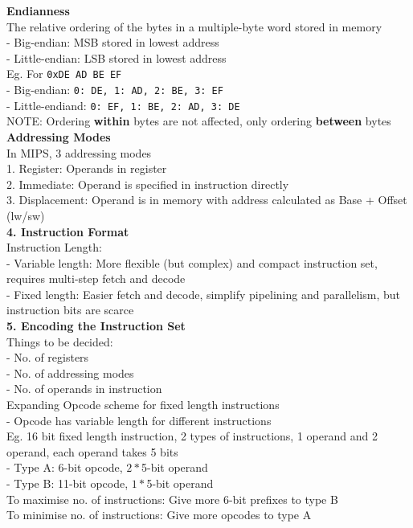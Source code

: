 \documentclass[10pt, a4paper]{article}
\begin{document}
\begin{multicols*}{3}
		\textbf{Endianness}\\
		The relative ordering of the bytes in a multiple-byte word stored in memory\\
		- Big-endian: MSB stored in lowest address\\
		- Little-endian: LSB stored in lowest address\\
		Eg. For \texttt{0xDE AD BE EF}\\
		- Big-endian: \texttt{0: DE, 1: AD, 2: BE, 3: EF}\\
		- Little-endiand: \texttt{0: EF, 1: BE, 2: AD, 3: DE}\\
		NOTE: Ordering \textbf{within} bytes are not affected, only ordering \textbf{between} bytes\\
		
		\textbf{Addressing Modes}\\
		In MIPS, 3 addressing modes\\
		1. Register: Operands in register\\
		2. Immediate: Operand is specified in instruction directly\\
		3. Displacement: Operand is in memory with address calculated as Base + Offset (lw/sw)\\
		
		\textbf{4. Instruction Format}\\
		Instruction Length:\\
		- Variable length: More flexible (but complex) and compact instruction set, requires multi-step fetch and decode\\
		- Fixed length: Easier fetch and decode, simplify pipelining and parallelism, but instruction bits are scarce\\
		
		\textbf{5. Encoding the Instruction Set}\\
		Things to be decided:\\
		- No. of registers\\
		- No. of addressing modes\\
		- No. of operands in instruction\\
		Expanding Opcode scheme for fixed length instructions\\
		- Opcode has variable length for different instructions\\
		Eg. 16 bit fixed length instruction, 2 types of instructions, 1 operand and 2 operand, each operand takes 5 bits\\
		- Type A: 6-bit opcode, $2 *$5-bit operand\\
		- Type B: 11-bit opcode, $1*$5-bit operand\\
		To maximise no. of instructions: Give more 6-bit prefixes to type B\\
		To minimise no. of instructions: Give more opcodes to type A\\
		

\end{multicols*}
\end{document}
